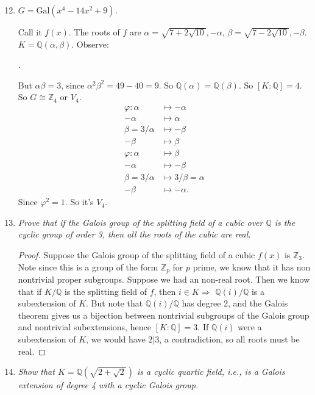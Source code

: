 \documentclass[9pt,reqno,twoside]{amsbook}
\theoremstyle{plain}
\numberwithin{section}{chapter}
\numberwithin{equation}{chapter}
\theoremstyle{definition}
\theoremstyle{remark}
\theoremstyle{plain}
\newcommand{\z}{\mathbb{Z}}
\newcommand{\Q}{\mathbb{Q}}
\newcommand{\bee}{\begin{equation}\begin{aligned}}
\newcommand{\eee}{\end{aligned}\end{equation}}
\newcommand{\counter}{\setcounter}
\newcommand{\gal}{\mathrm{Gal}}
\newcommand{\qwe}{\sqrt}
\renewcommand{\phi}{\varphi}
\begin{document}
\begin{enumerate}[label=\arabic*.]
\counter{enumi}{11}

\item \textit{$G = \gal(x^4 - 14x^2 + 9)$. }

Call it $f(x)$. The roots of $f$ are $\alpha = \sqrt{7 + 2\sqrt{10}}, -\alpha$, $\beta = \sqrt{7 - 2\sqrt{10}},-\beta$. $K = \Q(\alpha,\beta)$. Observe:
\begin{center}
.
\end{center}

But $\alpha\beta = 3$, since $\alpha^2\beta^2 = 49 - 40= 9$. So $\Q(\alpha) = \Q(\beta)$. So $[K:\Q] = 4$. So $G \cong \z_4$ or $V_4$. 
\bee
\phi:\alpha &\mapsto -\alpha\\
-\alpha &\mapsto \alpha\\
\beta = 3/\alpha &\mapsto -\beta\\
-\beta &\mapsto \beta\\
\phi:\alpha &\mapsto \beta\\
-\alpha &\mapsto -\beta\\
\beta = 3/\alpha &\mapsto 3/\beta = \alpha\\
-\beta &\mapsto -\alpha.
\eee
Since $\phi^2 = 1$. So it's $V_4$. 

\item \textit{Prove that if the Galois group of the splitting field of a cubic over $\Q$ is the cyclic group of order 3, then all the roots of the cubic are real. }

\begin{proof}
Suppose the Galois group of the splitting field of a cubic $f(x)$ is $\z_3$. Note since this is a group of the form $\z_p$ for $p$ prime, we know that it has non nontrivial proper subgroups. Suppose we had an non-real root. Then we know that if $K/\Q$ is the splitting field of $f$, then $i \in K \Rightarrow$ $\Q(i)/\Q$ is a subextension of $K$. But note that $\Q(i)/\Q$ has degree 2, and the Galois theorem gives us a bijection between nontrivial subgroups of the Galois group and nontrivial subextensions, hence $[K:\Q] = 3$. If $\Q(i)$ were a subextension of $K$, we would have $2|3$, a contradiction, so all roots must be real. 
\end{proof}

\item \textit{Show that $K = \Q(\qwe{2 + \qwe{2}})$ is a cyclic quartic field, i.e., is a Galois extension of degree 4 with a cyclic Galois group. }


\end{enumerate}
\end{document}
